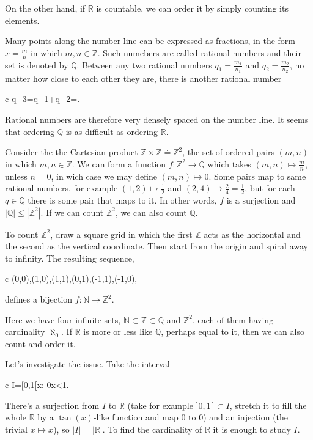 \documentclass[11pt,oneside,%
]{memoir}
\newenvironment{eqna}{\begin{IEEEeqnarray}{c}}{\end{IEEEeqnarray}\ignorespacesafterend}
\newcommand{\NN}{\mathbb{N}}
\newcommand{\RR}{\mathbb{R}}
\newcommand{\ZZ}{\mathbb{Z}}
\newcommand{\QQ}{\mathbb{Q}}
\begin{document}
On the other hand, if \(\RR\) is countable, we can order it by simply counting its elements.

Many points along the number line can be expressed as fractions, in the form \(x=\frac{m}{n}\) in which \(m,n\in\ZZ\). Such numebers are called rational numbers and their set is denoted by \(\QQ\). Between any two rational numbers \(q_1=\frac{m_1}{n_1}\) and \(q_2=\frac{m_2}{n_2}\), no matter how close to each other they are, there is another rational number
\begin{eqna}
    q_3=q_1+q_2=.
\end{eqna}
Rational numbers are therefore very densely spaced on the number line. It seems that ordering \(\QQ\) is as difficult as ordering \(\RR\).

Consider the the Cartesian product \(\ZZ\times\ZZ\doteq\ZZ^2\), the set of ordered pairs \((m,n)\) in which \(m,n\in\ZZ\). We can form a function \(f:\ZZ^2\rightarrow\QQ\) which takes \((m,n)\mapsto\frac{m}{n}\), unless \(n=0\), in wich case we may define \((m,n)\mapsto 0\). Some pairs map to same rational numbers, for example \((1,2)\mapsto\frac{1}{2}\) and \((2,4)\mapsto\frac{2}{4}=\frac{1}{2}\), but for each \(q\in\QQ\) there is some pair that maps to it. In other words, \(f\) is a surjection and \(|\QQ|\leq|\ZZ^2|\). If we can count \(\ZZ^2\), we can also count \(\QQ\).

To count \(\ZZ^2\), draw a square grid in which the first \(\ZZ\) acts as the horizontal and the second as the vertical coordinate. Then start from the origin and spiral away to infinity. The resulting sequence,
\begin{eqna}
    (0,0),(1,0),(1,1),(0,1),(-1,1),(-1,0),\dotsc%
\end{eqna}
defines a bijection \(f:\NN\rightarrow\ZZ^2\).

Here we have four infinite sets, \(\NN\subset\ZZ\subset\QQ\) and \(\ZZ^2\), each of them having cardinality \(\aleph_0\). If \(\RR\) is more or less like \(\QQ\), perhaps equal to it, then we can also count and order it. %

Let's investigate the issue. Take the interval
\begin{eqna}
    I=[0,1[\;\doteq\lbrace x\in\RR : 0\leq x<1\rbrace.
\end{eqna}
There's a surjection from \(I\) to \(\RR\) (take for example \(]0,1[\,\subset I\), stretch it to fill the whole \(\RR\) by a \(\tan(x)\)-like function and map \(0\) to \(0\)) and an injection (the trivial \(x\mapsto x\)), so \(|I|=|\RR|\). To find the cardinality of \(\RR\) it is enough to study \(I\).
\end{document}
